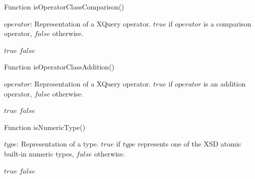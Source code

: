 \begin{algorithm}
\caption{Function isOperatorClassComparison()}
\label{ALG_func_isOperatorClassComparison}
\begin{algorithmic}[1]
\REQUIRE $operator$: Representation of a XQuery operator.
\ENSURE $true$ if $operator$ is a comparison operator, $false$ otherwise.

    \RETURN $true$
\ELSE
    \RETURN $false$
\ENDIF
\end{algorithmic}
\end{algorithm}

\begin{algorithm}
\caption{Function isOperatorClassAddition()}
\label{ALG_func_isOperatorClassAddition}
\begin{algorithmic}[1]
\REQUIRE $operator$: Representation of a XQuery operator.
\ENSURE $true$ if $operator$ is an addition operator, $false$ otherwise.

    \RETURN $true$
\ELSE
    \RETURN $false$
\ENDIF
\end{algorithmic}
\end{algorithm}

\begin{algorithm}
\caption{Function isNumericType()}
\label{ALG_func_isNumericType}
\begin{algorithmic}[1]
\REQUIRE $type$: Representation of a type.
\ENSURE $true$ if $type$ represents one of the XSD atomic built-in numeric types, $false$ otherwise.

    \RETURN $true$
\ELSE
    \RETURN $false$
\ENDIF
\end{algorithmic}
\end{algorithm}

